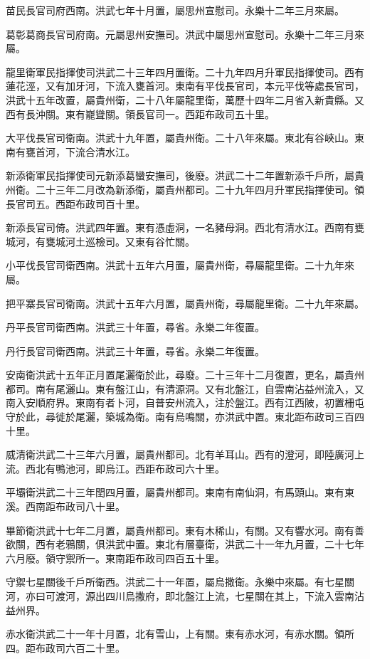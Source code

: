 苗民長官司府西南。洪武七年十月置，屬思州宣慰司。永樂十二年三月來屬。

葛彰葛商長官司府南。元屬思州安撫司。洪武中屬思州宣慰司。永樂十二年三月來屬。

龍里衛軍民指揮使司洪武二十三年四月置衛。二十九年四月升軍民指揮使司。西有蓮花涇，又有加牙河，下流入甕首河。東南有平伐長官司，本元平伐等處長官司，洪武十五年改置，屬貴州衛，二十八年屬龍里衛，萬歷十四年二月省入新貴縣。又西有長沖關。東有巃聳關。領長官司一。西距布政司五十里。

大平伐長官司衛南。洪武十九年置，屬貴州衛。二十八年來屬。東北有谷峽山。東南有甕首河，下流合清水江。

新添衛軍民指揮使司元新添葛蠻安撫司，後廢。洪武二十二年置新添千戶所，屬貴州衛。二十三年二月改為新添衛，屬貴州都司。二十九年四月升軍民指揮使司。領長官司五。西距布政司百十里。

新添長官司倚。洪武四年置。東有憑虛洞，一名豬母洞。西北有清水江。西南有甕城河，有甕城河土巡檢司。又東有谷忙關。

小平伐長官司衛西南。洪武十五年六月置，屬貴州衛，尋屬龍里衛。二十九年來屬。

把平寨長官司衛南。洪武十五年六月置，屬貴州衛，尋屬龍里衛。二十九年來屬。

丹平長官司衛西南。洪武三十年置，尋省。永樂二年復置。

丹行長官司衛西南。洪武三十年置，尋省。永樂二年復置。

安南衛洪武十五年正月置尾灑衛於此，尋廢。二十三年十二月復置，更名，屬貴州都司。南有尾灑山。東有盤江山，有清源洞。又有北盤江，自雲南沾益州流入，又南入安順府界。東南有者卜河，自普安州流入，注於盤江。西有江西陂，初置柵屯守於此，尋徙於尾灑，築城為衛。南有烏鳴關，亦洪武中置。東北距布政司三百四十里。

威清衛洪武二十三年六月置，屬貴州都司。北有羊耳山。西有的澄河，即陸廣河上流。西北有鴨池河，即烏江。西距布政司六十里。

平壩衛洪武二十三年閏四月置，屬貴州都司。東南有南仙洞，有馬頭山。東有東溪。西南距布政司八十里。

畢節衛洪武十七年二月置，屬貴州都司。東有木稀山，有關。又有響水河。南有善欲關，西有老鴉關，俱洪武中置。東北有層臺衛，洪武二十一年九月置，二十七年六月廢。領守禦所一。東南距布政司四百五十里。

守禦七星關後千戶所衛西。洪武二十一年置，屬烏撒衛。永樂中來屬。有七星關河，亦曰可渡河，源出四川烏撒府，即北盤江上流，七星關在其上，下流入雲南沾益州界。

赤水衛洪武二十一年十月置，北有雪山，上有關。東有赤水河，有赤水關。領所四。距布政司六百二十里。

